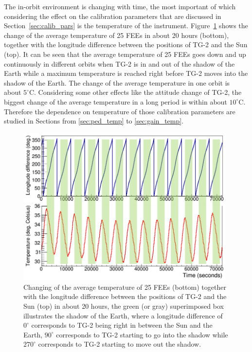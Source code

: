 \documentclass[preprint,sort&compress,12pt]{elsarticle}
\begin{document}
The in-orbit environment is changing with time, the most important of which considering the effect on the calibration parameters that are discussed in Section~\ref{sec:calib_pars} is the temperature of the instrument. Figure~\ref{fig:temperature_change} shows the change of the average temperature of 25 FEEs in about 20 hours (bottom), together with the longitude difference between the positions of TG-2 and the Sun (top). It can be seen that the average temperature of 25 FEEs goes down and up continuously in different orbits when TG-2 is in and out of the shadow of the Earth while a maximum temperature is reached right before TG-2 moves into the shadow of the Earth. The change of the average temperature in one orbit is about $5^\circ\mathrm{C}$. Considering some other effects like the attitude change of TG-2, the biggest change of the average temperature in a long period is within about $10^\circ\mathrm{C}$. Therefore the dependence on temperature of those calibration parameters are studied in Sections from \ref{sec:ped_temp} to \ref{sec:gain_temp}.

\begin{figure}[!ht]
\centering
\includegraphics[width=11cm]{images/temperature_change.png}
\caption{Changing of the average temperature of 25 FEEs (bottom) together with the longitude difference between the positions of TG-2 and the Sun (top) in about 20 hours, the green (or gray) superimposed box illustrates the shadow of the Earth, where a longitude difference of $0^\circ$ corresponds to TG-2 being right in between the Sun and the Earth, $90^\circ$ corresponds to TG-2 starting to go into the shadow while $270^\circ$ corresponds to TG-2 starting to move out the shadow.}\label{fig:temperature_change}
\end{figure}
\end{document}
